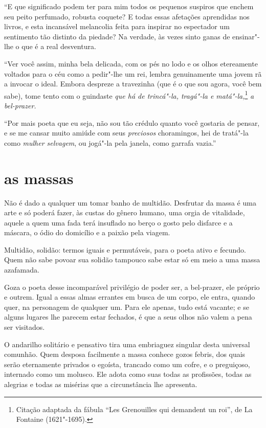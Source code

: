 “E que significado podem ter para mim todos os pequenos
suspiros que enchem seu peito perfumado, robusta coquete? E todas essas
afetações aprendidas nos livros, e esta incansável melancolia feita
para inspirar no espectador um sentimento tão distinto da piedade? Na
verdade, às vezes sinto ganas de ensinar"-lhe o que é a real
desventura.

“Ver você assim, minha bela delicada, com os pés no lodo e
os olhos etereamente voltados para o céu como a pedir"-lhe um rei,
lembra genuinamente uma jovem rã a invocar o ideal. Embora
despreze a travezinha (que é o que sou agora, você bem sabe), tome
tento com o guindaste \textit{que há de trincá"-la, tragá"-la e matá"-la,}\protect\footnote{  Citação 
adaptada da fábula ``Les Grenouilles qui demandent un roi'', 
de La Fontaine (1621"-1695).}
\textit{a bel-prazer.}

“Por mais poeta que eu seja, não sou tão crédulo quanto
você gostaria de pensar, e se me cansar muito amiúde com seus \textit{preciosos}
choramingos, hei de tratá"-la como \textit{mulher selvagem}, ou jogá"-la pela
janela, como garrafa vazia.''

\quebra\section[As massas]{as massas}

Não é dado a qualquer um tomar banho de multidão. Desfrutar da massa é uma
arte e só poderá fazer, às custas do gênero humano, uma orgia de
vitalidade, aquele a quem uma fada terá insuflado no berço o gosto
pelo disfarce e a máscara, o ódio do domicílio e a paixão pela
viagem.

Multidão, solidão: termos iguais e permutáveis, para o poeta ativo e
fecundo. Quem não sabe povoar sua solidão tampouco sabe estar só em
meio a uma massa azafamada.

Goza o poeta desse incomparável privilégio de poder ser, a bel-prazer,
ele próprio e outrem. Igual a essas almas errantes em busca de um corpo,
ele entra, quando quer, na personagem de qualquer um. Para ele apenas, tudo
está vacante; e se alguns lugares lhe parecem estar fechados, é que a
seus olhos não valem a pena ser visitados.

O andarilho solitário e pensativo tira uma embriaguez singular desta
universal comunhão. Quem desposa facilmente a massa conhece gozos
febris, dos quais serão eternamente privados o egoísta, trancado como
um cofre, e o preguiçoso, internado como um molusco. Ele adota como
suas todas as profissões, todas as alegrias e todas as misérias que a
circunstância lhe apresenta.

